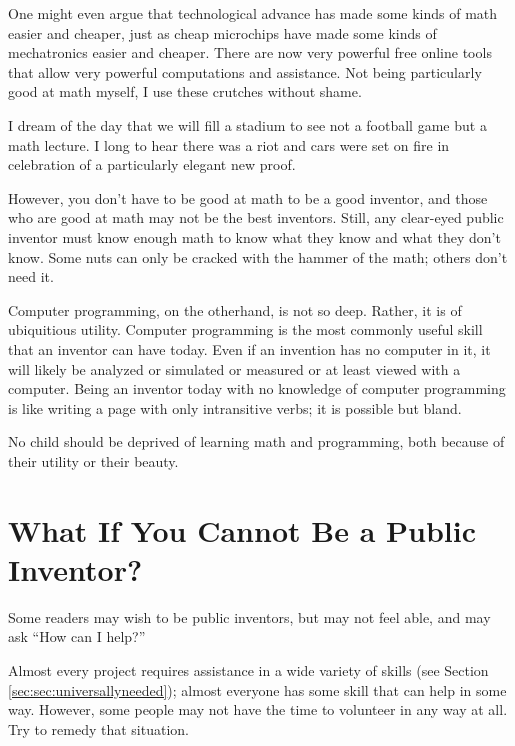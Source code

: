 \documentclass[
	fontsize=10pt, %
	twoside=false, %
	secnumdepth=1, %
]{kaobook}
\begin{document}
One might even argue that technological advance has made some kinds
of math easier and cheaper, just as cheap microchips have made some kinds of
mechatronics easier and cheaper. There are now very powerful free online tools
that allow very powerful computations and assistance.
Not being particularly good at math myself, I use these crutches without shame.

I dream of the day that we will fill a stadium to see not
a football game but a math lecture. I long to hear there was a riot and
cars were set on fire in celebration of a particularly elegant new proof.

However, you don't have to be good at math to be a good inventor, and
those who are good at math may not be the best inventors. Still,
any clear-eyed public inventor must know enough math to know what
they know and what they don't know. Some nuts can only be cracked
with the hammer of the math; others don't need it.

Computer programming, on the otherhand, is not so deep.
Rather, it is of ubiquitious utility. Computer programming
is the most commonly useful skill that an inventor can have today.
Even if an invention has no computer in it, it will likely be
analyzed or simulated or measured or at least viewed with a
computer. Being an inventor today with no knowledge of computer
programming is like writing a page with only intransitive verbs;
it is possible but bland.

No child should be deprived of learning math and programming,
both because of their utility or their beauty.



\chapter{What If You Cannot Be a Public Inventor?}

Some readers may wish to be public inventors, but may not
feel able, and may ask ``How can I help?''

Almost every project requires assistance in a wide variety
of skills (see Section \ref{sec:sec:universallyneeded}); almost everyone has some skill that can help in some way.
However, some people may not have the time to volunteer in any way
at all. Try to remedy that situation.
\end{document}
